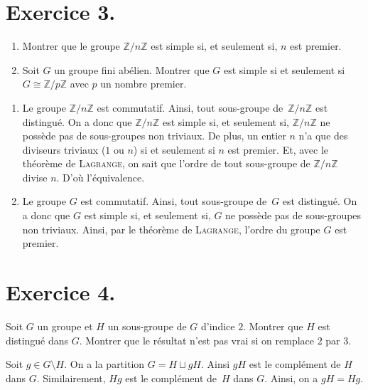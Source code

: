 \documentclass[./main]{subfiles}
\begin{document}
  \section{Exercice 3.}
  \begin{enonce}
    \begin{enumerate}
      \item Montrer que le groupe $\mathds{Z} / n\mathds{Z}$ est simple si, et seulement si, $n$ est premier.
      \item Soit $G$ un groupe fini abélien. Montrer que $G$ est simple si et seulement si $G \cong \mathds{Z}/p\mathds{Z}$ avec $p$ un nombre premier.
    \end{enumerate}
  \end{enonce}

  \begin{enumerate}
    \item Le groupe $\mathds{Z} / n \mathds{Z}$ est commutatif. Ainsi, tout sous-groupe de~$\mathds{Z} / n \mathds{Z}$ est distingué.
      On a donc que $\mathds{Z}/ n\mathds{Z}$ est simple si, et seulement si,  $\mathds{Z} / n \mathds{Z}$ ne possède pas de sous-groupes non triviaux.
      De plus, un entier $n$ n'a que des diviseurs triviaux ($1$ ou  $n$) si et seulement si $n$ est premier.
      Et, avec le théorème de \textsc{Lagrange}, on sait que l'ordre de tout sous-groupe de $\mathds{Z} / n \mathds{Z}$ divise $n$.
      D'où l'équivalence.
    \item Le groupe $G$ est commutatif. Ainsi, tout sous-groupe de~$G$ est distingué.
      On a donc que $G$ est simple si, et seulement si,  $G$ ne possède pas de sous-groupes non triviaux.
      Ainsi, par le théorème de \textsc{Lagrange}, l'ordre du groupe $G$ est premier.
  \end{enumerate}

  \section{Exercice 4.}
  \begin{enonce}
    Soit $G$ un groupe et $H$ un sous-groupe de $G$ d'indice $2$.
    Montrer que $H$ est distingué dans $G$. Montrer que le résultat n'est pas vrai si on remplace $2$ par $3$.
  \end{enonce}

  Soit $g \in G \setminus H$. On a la partition $G = H \sqcup gH$.
  Ainsi $gH$ est le complément de $H$ dans $G$.
  Similairement, $Hg$ est le complément de~$H$ dans $G$.
  Ainsi, on a $gH = Hg$.
\end{document}
